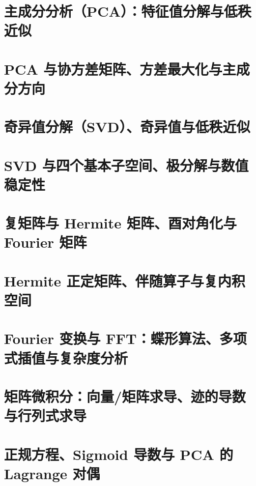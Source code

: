 \documentclass[11pt,a4paper]{ctexart}
\begin{document}
\newpage
\section{主成分分析（PCA）：特征值分解与低秩近似}


\newpage
\section{PCA 与协方差矩阵、方差最大化与主成分方向}


\newpage
\section{奇异值分解（SVD）、奇异值与低秩近似}


\newpage
\section{SVD 与四个基本子空间、极分解与数值稳定性}


\newpage
\section{复矩阵与 Hermite 矩阵、酉对角化与 Fourier 矩阵}


\newpage
\section{Hermite 正定矩阵、伴随算子与复内积空间}


\newpage
\section{Fourier 变换与 FFT：蝶形算法、多项式插值与复杂度分析}


\newpage
\section{矩阵微积分：向量/矩阵求导、迹的导数与行列式求导}


\newpage
\section{正规方程、Sigmoid 导数与 PCA 的 Lagrange 对偶}

\end{document}
